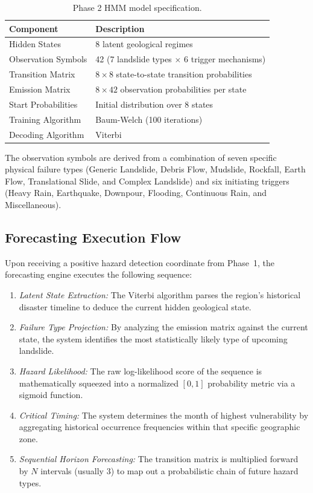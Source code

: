 \documentclass[12pt,a4paper]{report}
\begin{document}
\begin{table}[H]
\begin{center}
\caption{Phase 2 HMM model specification.}\label{tab:hmm_spec}
\begin{tabular}{ll}
\hline
{\bf Component} & {\bf Description} \\
\hline
Hidden States & 8 latent geological regimes \\
Observation Symbols & 42 (7 landslide types $\times$ 6 trigger mechanisms) \\
Transition Matrix & $8 \times 8$ state-to-state transition probabilities \\
Emission Matrix & $8 \times 42$ observation probabilities per state \\
Start Probabilities & Initial distribution over 8 states \\
Training Algorithm & Baum-Welch (100 iterations) \\
Decoding Algorithm & Viterbi \\
\hline
\end{tabular}
\end{center}
\end{table}

The observation symbols are derived from a combination of seven specific physical failure types (Generic Landslide, Debris Flow, Mudslide, Rockfall, Earth Flow, Translational Slide, and Complex Landslide) and six initiating triggers (Heavy Rain, Earthquake, Downpour, Flooding, Continuous Rain, and Miscellaneous).

\subsection{Forecasting Execution Flow}
Upon receiving a positive hazard detection coordinate from Phase~1, the forecasting engine executes the following sequence:

\begin{enumerate}
    \item \textit{Latent State Extraction:} The Viterbi algorithm parses the region's historical disaster timeline to deduce the current hidden geological state.
    \item \textit{Failure Type Projection:} By analyzing the emission matrix against the current state, the system identifies the most statistically likely type of upcoming landslide.
    \item \textit{Hazard Likelihood:} The raw log-likelihood score of the sequence is mathematically squeezed into a normalized $[0,1]$ probability metric via a sigmoid function.
    \item \textit{Critical Timing:} The system determines the month of highest vulnerability by aggregating historical occurrence frequencies within that specific geographic zone.
    \item \textit{Sequential Horizon Forecasting:} The transition matrix is multiplied forward by $N$ intervals (usually 3) to map out a probabilistic chain of future hazard types.
\end{enumerate}
\end{document}

